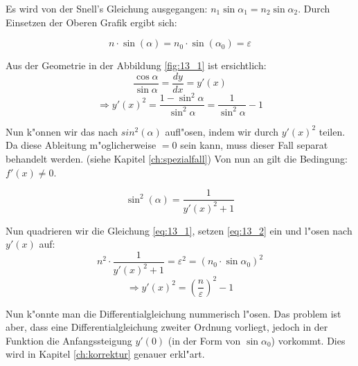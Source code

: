 Es wird von der Snell's Gleichung ausgegangen: $n_1 \sin \alpha_1 = n_2 \sin \alpha_2$.
Durch Einsetzen der Oberen Grafik ergibt sich:

\begin{equation} \label{eq:13_1}
  n \cdot \sin(\alpha) = n_0 \cdot \sin(\alpha_0) = \varepsilon
\end{equation}

Aus der Geometrie in der Abbildung \ref{fig:13_1} ist ersichtlich:
$$\frac{\cos \alpha}{\sin \alpha} = \frac{dy}{dx} = y'(x)$$
$$\Rightarrow y'(x)^2 = \frac{1 - \sin^2 \alpha}{\sin^2 \alpha} = \frac{1}{\sin^2
\alpha} - 1$$

Nun k"onnen wir das nach $sin^2(\alpha)$ aufl"osen, indem wir durch $y'(x)^2$ teilen. Da
diese Ableitung m"oglicherweise $=0$ sein kann, muss dieser Fall separat behandelt werden.
(siehe Kapitel \ref{ch:spezialfall}) Von nun an gilt die Bedingung: $f'(x) \neq 0$.

\begin{equation} \label{eq:13_2}
\sin^2 (\alpha) = \frac{1}{y'(x)^2 + 1}
\end{equation}

Nun quadrieren wir die Gleichung \ref{eq:13_1}, setzen \ref{eq:13_2} ein und l"osen
nach $y'(x)$ auf:
\begin{equation} \label{eq:13_3}
n^2 \cdot \frac{1}{y'(x)^2 + 1} = \varepsilon^2 = (n_0 \cdot \sin \alpha_0)^2
\end{equation}
\begin{equation} \label{eq:13_4}
\Rightarrow y'(x)^2 = \left( \frac{n}{\varepsilon} \right)^2 - 1
\end{equation}

Nun k"onnte man die Differentialgleichung nummerisch l"osen. Das problem ist aber, dass 
eine Differentialgleichung zweiter Ordnung vorliegt, jedoch in der Funktion die
Anfangssteigung $y'(0)$ (in der Form von $\sin \alpha_0$) vorkommt. Dies wird in Kapitel
\ref{ch:korrektur} genauer erkl"art.

